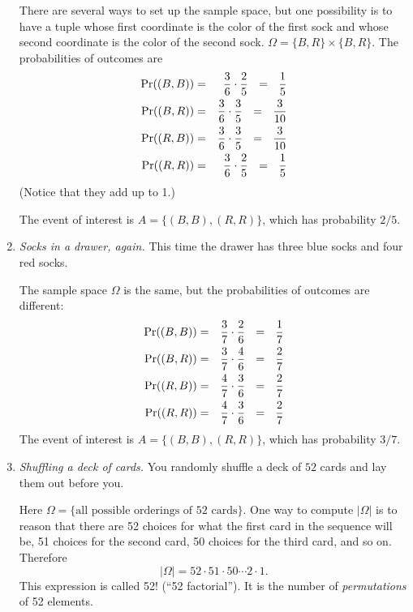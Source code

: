 \begin{enumerate}
There are several ways to set up the sample space, but one possibility is to have a tuple whose first coordinate is the color of the first sock and whose second coordinate is the color of the second sock. $\Omega = \{B,R\} \times \{B,R\}$. The probabilities of outcomes are
\begin{eqnarray*}
\pr((B,B)) & = & \frac{3}{6} \cdot \frac{2}{5} \ \ = \ \ \frac{1}{5} \\
\pr((B,R)) & = & \frac{3}{6} \cdot \frac{3}{5} \ \ = \ \ \frac{3}{10} \\
\pr((R,B)) & = & \frac{3}{6} \cdot \frac{3}{5} \ \ = \ \ \frac{3}{10} \\
\pr((R,R)) & = & \frac{3}{6} \cdot \frac{2}{5} \ \ = \ \ \frac{1}{5}
\end{eqnarray*}
(Notice that they add up to 1.)

The event of interest is $A = \{(B,B), (R,R)\}$, which has probability $2/5$.

\item {\it Socks in a drawer, again.} This time the drawer has three blue socks and four red socks.

The sample space $\Omega$ is the same, but the probabilities of outcomes are different:
\begin{eqnarray*}
\pr((B,B)) & = & \frac{3}{7} \cdot \frac{2}{6} \ \ = \ \ \frac{1}{7} \\
\pr((B,R)) & = & \frac{3}{7} \cdot \frac{4}{6} \ \ = \ \ \frac{2}{7} \\
\pr((R,B)) & = & \frac{4}{7} \cdot \frac{3}{6} \ \ = \ \ \frac{2}{7} \\
\pr((R,R)) & = & \frac{4}{7} \cdot \frac{3}{6} \ \ = \ \ \frac{2}{7}
\end{eqnarray*}
The event of interest is $A = \{(B,B), (R,R)\}$, which has probability $3/7$.

\item {\it Shuffling a deck of cards.} You randomly shuffle a deck of $52$ cards and lay them out before you.

Here $\Omega = \{\mbox{all possible orderings of 52 cards}\}$. One way to compute $|\Omega|$ is to reason that there are 52 choices for what the first card in the sequence will be, 51 choices for the second card, 50 choices for the third card, and so on. Therefore
$$ |\Omega| = 52 \cdot 51 \cdot 50 \cdots 2 \cdot 1 .$$
This expression is called 52! (``52 factorial''). It is the number of {\it permutations} of 52 elements.

\end{enumerate}

